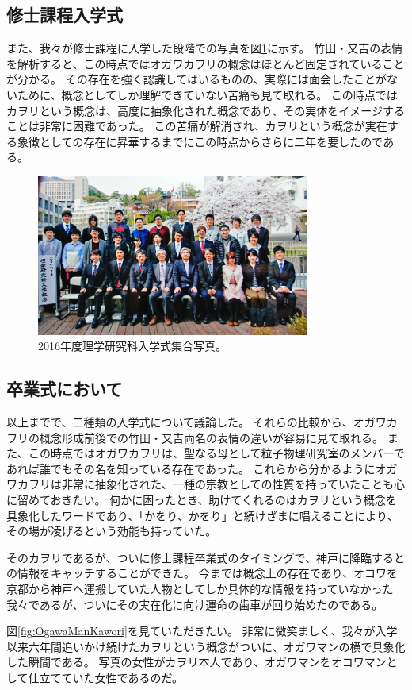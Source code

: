 \subsection{修士課程入学式}

また、我々が修士課程に入学した段階での写真を図\ref{fig:H28Nyugakushiki}に示す。
竹田・又吉の表情を解析すると、この時点ではオガワカヲリの概念はほとんど固定されていることが分かる。
その存在を強く認識してはいるものの、実際には面会したことがないために、概念としてしか理解できていない苦痛も見て取れる。
この時点ではカヲリという概念は、高度に抽象化された概念であり、その実体をイメージすることは非常に困難であった。
この苦痛が解消され、カヲリという概念が実在する象徴としての存在に昇華するまでにこの時点からさらに二年を要したのである。\par

\begin{figure}[H]
  \centering
  \includegraphics[width=0.8\textwidth]{./section/Kawori/figures/H28Nyugakushiki.jpg}
  \caption{2016年度理学研究科入学式集合写真。}
\label{fig:H28Nyugakushiki}
\end{figure}

\subsection{卒業式において}
以上までで、二種類の入学式について議論した。
それらの比較から、オガワカヲリの概念形成前後での竹田・又吉両名の表情の違いが容易に見て取れる。
また、この時点ではオガワカヲリは、聖なる母として粒子物理研究室のメンバーであれば誰でもその名を知っている存在であった。
これらから分かるようにオガワカヲリは非常に抽象化された、一種の宗教としての性質を持っていたことも心に留めておきたい。
何かに困ったとき、助けてくれるのはカヲリという概念を具象化したワードであり、「かをり、かをり」と続けざまに唱えることにより、
その場が凌げるという効能も持っていた。
\par
そのカヲリであるが、ついに修士課程卒業式のタイミングで、神戸に降臨するとの情報をキャッチすることができた。
今までは概念上の存在であり、オコワを京都から神戸へ運搬していた人物としてしか具体的な情報を持っていなかった我々であるが、ついにその実在化に向け運命の歯車が回り始めたのである。
\par
図\ref{fig:OgawaManKawori}を見ていただきたい。
非常に微笑ましく、我々が入学以来六年間追いかけ続けたカヲリという概念がついに、オガワマンの横で具象化した瞬間である。
写真の女性がカヲリ本人であり、オガワマンをオコワマンとして仕立てていた女性であるのだ。

